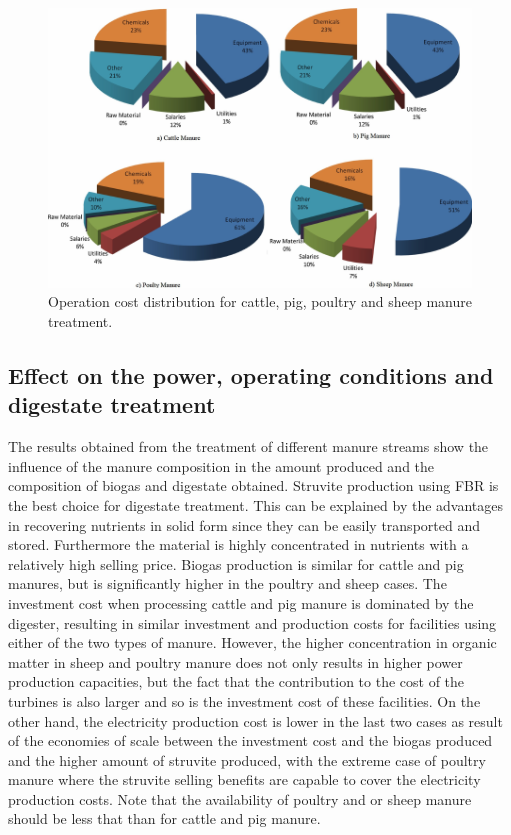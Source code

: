 \begin{refsection}[referencesCh2]
\begin{figure}[h!]
	\centering
	\includegraphics[width=0.9\linewidth, trim={0cm 0cm 0cm 0cm},clip]{gfx/Chapter2/Fig8.pdf} 
	\caption{Operation cost distribution for cattle, pig, poultry and sheep manure treatment.}
	\label{fig:OpCost}
\end{figure}

\subsection{Effect on the power, operating conditions and digestate treatment} \label{section:Effect}
The results obtained from the treatment of different manure streams show the influence of the manure composition in the amount produced and the composition of biogas and digestate obtained. Struvite production using FBR is the best choice for digestate treatment. This can be explained by the advantages in recovering nutrients in solid form since they can be easily transported and stored. Furthermore the material is highly concentrated in nutrients with a relatively high selling price. Biogas production is similar for cattle and pig manures, but is significantly higher in the poultry and sheep cases. The investment cost when processing cattle and pig manure is dominated by the digester, resulting in similar investment and production costs for facilities using either of the two types of manure. However, the higher concentration in organic matter in sheep and poultry manure does not only results in higher power production capacities, but the fact that the contribution to the cost of the turbines is also larger and so is the investment cost of these facilities. On the other hand, the electricity production cost is lower in the last two cases as result of the economies of scale between the investment cost and the biogas produced and the higher amount of struvite produced, with the extreme case of poultry manure where the struvite selling benefits are capable to cover the electricity production costs. Note that the availability of poultry and or sheep manure should be less that than for cattle and pig manure.



\end{refsection}
